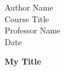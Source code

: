 \documentclass[12pt]{article}
\newcommand{\titletext}[1]
	{\begin{center}
			\textbf{#1}
	\end{center}}
\newcommand{\headertext}[4]
	{\begin{flushleft}
		   #1
		\\ #2
		\\ #3
		\\ #4
	\end{flushleft}}
\begin{document}
\headertext{Author Name}{Course Title}{Professor Name}{Date}

\titletext{My Title}
	
\end{document}

